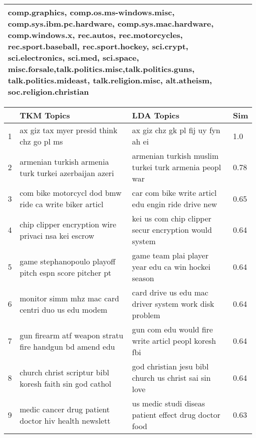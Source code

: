 \documentclass[twocolumn,10]{article}
\begin{document}
	\begin{table*}[htp!]
		\footnotesize
		\setlength\tabcolsep{3pt}
		\begin{tabular}{| p{\textwidth}  |}\hline 
			comp.graphics, comp.os.ms-windows.misc, comp.sys.ibm.pc.hardware, comp.sys.mac.hardware, comp.windows.x, rec.autos, rec.motorcycles, rec.sport.baseball, rec.sport.hockey, sci.crypt, sci.electronics, sci.med, sci.space, misc.forsale,talk.politics.misc,talk.politics.guns, talk.politics.mideast, talk.religion.misc, alt.atheism, soc.religion.christian \\ \hline
		\end{tabular}	
		\caption{The 20 Newsgroups} \label{tab:top}
		
		\begin{tabular}{|l| l | l | l |}\hline
			&TKM Topics	& LDA Topics & Sim \\ \hline
			\scriptsize{1}&\scriptsize{ax giz tax myer presid think chz go pl ms} & \scriptsize{ax giz chz gk pl fij uy fyn ah ei} & {1.0}\\ \hline 
			\scriptsize{2}&\scriptsize{armenian turkish armenia turk turkei azerbaijan azeri} & \scriptsize{armenian turkish muslim turkei turk armenia peopl war} & {0.78}\\ \hline 
			\scriptsize{3}&\scriptsize{com bike motorcycl dod bmw ride ca write biker articl} & \scriptsize{car com bike write articl edu engin ride drive new} & {0.65}\\ \hline 
			\scriptsize{4}&\scriptsize{chip clipper encryption wire privaci nsa kei escrow} & \scriptsize{kei us com chip clipper secur encryption would system} & {0.64}\\ \hline 
			\scriptsize{5}&\scriptsize{game stephanopoulo playoff pitch espn score pitcher pt} & \scriptsize{game team plai player year edu ca win hockei season} & {0.64}\\ \hline 
			\scriptsize{6}&\scriptsize{monitor simm mhz mac card centri duo us edu modem} & \scriptsize{card drive us edu mac driver system work disk problem} & {0.64}\\ \hline 
			\scriptsize{7}&\scriptsize{gun firearm atf weapon stratu fire handgun bd amend edu} & \scriptsize{gun com edu would fire write articl peopl koresh fbi} & {0.64}\\ \hline 
			\scriptsize{8}&\scriptsize{church christ scriptur bibl koresh faith sin god cathol} & \scriptsize{god christian jesu bibl church us christ sai sin love} & {0.64}\\ \hline 
			\scriptsize{9}&\scriptsize{medic cancer drug patient doctor hiv health newslett} & \scriptsize{us medic studi diseas patient effect drug doctor food} & {0.63}\\ \hline 

\end{tabular}
\end{table*}
\end{document}
